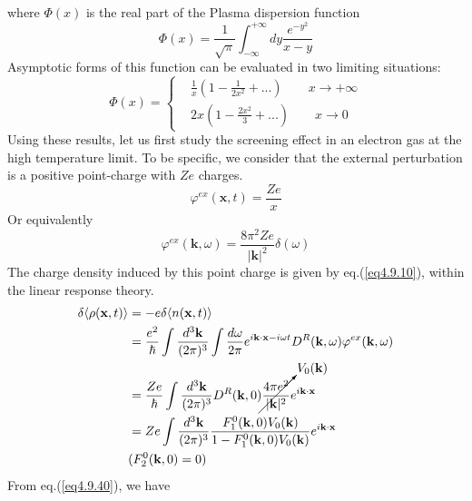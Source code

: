 where $\Phi(x)$ is the real part of the Plasma dispersion function
\begin{equation}
\Phi(x)=\frac{1}{\sqrt \pi} \int_{-\infty}^{+\infty} dy \frac{e^{-y^2}}{x-y}
\end{equation}
 Asymptotic forms of this function can be evaluated in two limiting situations:
\begin{equation}
\Phi(x)=
\left\{
\begin{aligned}
&\frac{1}{x}(1-\frac{1}{2x^2}+...)\qquad x\to+\infty\\
&2x(1-\frac{2x^2}{3}+...)\qquad x\to 0
\end{aligned}
\right.
\end{equation}
 Using these results, let us first study the screening effect in an electron gas at the high temperature limit.
 To be specific, we consider that the external perturbation is a positive point-charge with $Ze$ charges.
\begin{equation}
\varphi^{ex}(\mathbf x,t)=\frac{Ze}{x}
\end{equation}
Or equivalently
\begin{equation}\tag{4.9.44'}
\varphi^{ex}(\mathbf k,\omega)=\frac{8\pi^2Ze}{|\mathbf k|^2} \delta(\omega)
\end{equation}
The charge density induced by this point charge is given by eq.(\ref{eq4.9.10}), within the linear response theory.
\begin{equation}\label{eq4.9.45}
\begin{aligned}
\delta\langle\rho(\mathbf x,t)\rangle&=-e\delta\langle n(\mathbf x,t)\rangle\\
&=\frac{e^2}{\hbar}\int \frac{d^3\mathbf k}{(2\pi)^3} \int\frac{d\omega}{2\pi} e^{i\mathbf k\cdot \mathbf x-i\omega t}D^R(\mathbf k,\omega)\varphi^{ex}(\mathbf k,\omega)\\
&=\frac{Ze}{\hbar} \int \frac{d^3\mathbf k}{(2\pi)^3} D^R(\mathbf k,0) \cancelto{V_0(\mathbf k)}{\frac{4\pi e^2}{|\mathbf k|^2}} e^{i\mathbf k\cdot \mathbf x}\\
&=Ze\int \frac{d^3\mathbf k}{(2\pi)^3}\frac{F^0_1(\mathbf k,0)V_0(\mathbf k)}{1-F^0_1(\mathbf k,0)V_0(\mathbf k)} e^{i\mathbf k\cdot \mathbf x}\\
&(F_2^0(\mathbf k,0)=0)
\end{aligned}
\end{equation}
From eq.(\ref{eq4.9.40}), we have
